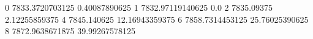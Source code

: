 0 7833.3720703125 0.40087890625
1 7832.97119140625 0.0
2 7835.09375 2.12255859375
4 7845.140625 12.16943359375
6 7858.7314453125 25.76025390625
8 7872.9638671875 39.99267578125
